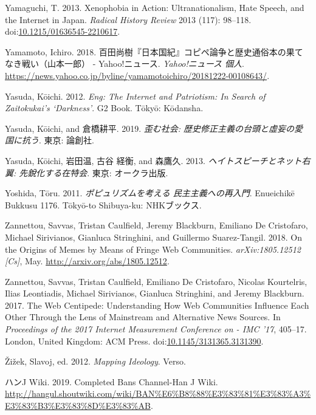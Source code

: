 \documentclass[10pt,british,A4paper,,openany]{memoir}
\begin{document}
\hypertarget{ref-yamaguchi_xenophobia_2013}{}
Yamaguchi, T. 2013. Xenophobia in Action: Ultranationalism, Hate Speech,
and the Internet in Japan. \emph{Radical History Review} 2013 (117):
98--118.
doi:\href{https://doi.org/10.1215/01636545-2210617}{10.1215/01636545-2210617}.

\hypertarget{ref-yamamoto__2018}{}
Yamamoto, Ichiro. 2018.
百田尚樹『日本国紀』コピペ論争と歴史通俗本の果てなき戦い（山本一郎） -
Yahoo!ニュース. \emph{Yahoo!ニュース 個人}.
\url{https://news.yahoo.co.jp/byline/yamamotoichiro/20181222-00108643/}.

\hypertarget{ref-yasuda_eng:_2012}{}
Yasuda, Kōichi. 2012. \emph{Eng: The Internet and Patriotism: In Search
of Zaitokukai's `Darkness'}. G2 Book. Tōkyō: Kōdansha.

\hypertarget{ref-yasuda_:_2019}{}
Yasuda, Kōichi, and 倉橋耕平. 2019. \emph{歪む社会:
歴史修正主義の台頭と虛妄の愛国に抗う}. 東京: 論創社.

\hypertarget{ref-yasuda_:_2013}{}
Yasuda, Kōichi, 岩田温, 古谷 経衡, and 森鷹久. 2013.
\emph{ヘイトスピーチとネット右翼: 先銳化する在特会}. 東京: オークラ出版.

\hypertarget{ref-yoshida__2011}{}
Yoshida, Tōru. 2011. \emph{ポピュリズムを考える 民主主義への再入門}.
Enueichikē Bukkusu 1176. Tōkyō-to Shibuya-ku: NHKブックス.

\hypertarget{ref-zannettou_origins_2018}{}
Zannettou, Savvas, Tristan Caulfield, Jeremy Blackburn, Emiliano De
Cristofaro, Michael Sirivianos, Gianluca Stringhini, and Guillermo
Suarez-Tangil. 2018. On the Origins of Memes by Means of Fringe Web
Communities. \emph{arXiv:1805.12512 {[}Cs{]}}, May.
\url{http://arxiv.org/abs/1805.12512}.

\hypertarget{ref-zannettou_web_2017}{}
Zannettou, Savvas, Tristan Caulfield, Emiliano De Cristofaro, Nicolas
Kourtelris, Ilias Leontiadis, Michael Sirivianos, Gianluca Stringhini,
and Jeremy Blackburn. 2017. The Web Centipede: Understanding How Web
Communities Influence Each Other Through the Lens of Mainstream and
Alternative News Sources. In \emph{Proceedings of the 2017 Internet
Measurement Conference on - IMC '17}, 405--17. London, United Kingdom:
ACM Press.
doi:\href{https://doi.org/10.1145/3131365.3131390}{10.1145/3131365.3131390}.

\hypertarget{ref-zizek_mapping_2012}{}
Žižek, Slavoj, ed. 2012. \emph{Mapping Ideology}. Verso.

\hypertarget{ref-j_wiki_completed_2019}{}
ハンJ Wiki. 2019. Completed Bans Channel-Han J Wiki.
\url{http://hangul.shoutwiki.com/wiki/BAN\%E6\%B8\%88\%E3\%83\%81\%E3\%83\%A3\%E3\%83\%B3\%E3\%83\%8D\%E3\%83\%AB}.
\end{document}
